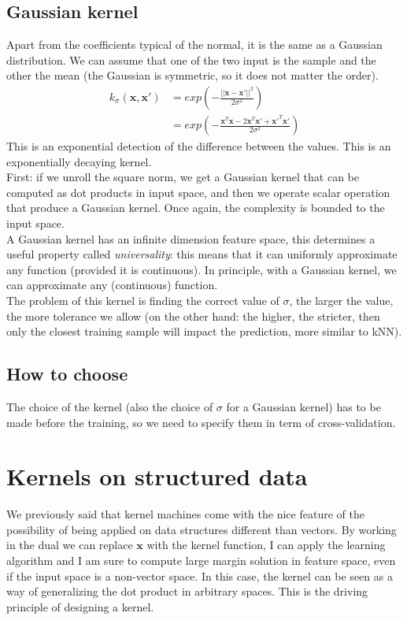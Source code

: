     \subsection{Gaussian kernel}
        \label{cha:gaussian_kernel}
        Apart from the coefficients typical of the normal, it is the same as a Gaussian distribution.  
        We can assume that one of the two input is the sample and the other the mean (the Gaussian is symmetric, so it does not matter the order).
        \begin{align*}
            k_{\sigma} (\pmb{x}, \pmb{x}') &= exp {\left(- \frac{||\pmb{x} - \pmb{x}'||^2}{2 \sigma^2} \right) } \\
                &= exp {\left( - \frac{\pmb{x}^T \pmb{x} - 2 \pmb{x}^T \pmb{x}' + \pmb{x}'^T\pmb{x}' }{2\sigma^2} \right)}
        \end{align*}
        This is an exponential detection of the difference between the values. This is an exponentially decaying kernel.\\
        
        First: if we unroll the square norm, we get a Gaussian kernel that can be computed as dot products in input space, and then we operate scalar operation that produce a Gaussian kernel.
        Once again, the complexity is bounded to the input space.\\
        A Gaussian kernel has an infinite dimension feature space, this determines a useful property called \textit{universality}: this means that it can uniformly approximate any function (provided it is continuous). 
        In principle, with a Gaussian kernel, we can approximate any (continuous) function.\\

        The problem of this kernel is finding the correct value of $\sigma$, the larger the value, the more tolerance we allow (on the other hand: the higher, the stricter, then only the closest training sample will impact the prediction, more similar to kNN). 

    \subsection{How to choose}
        The choice of the kernel (also the choice of $\sigma$ for a Gaussian kernel) has to be made before the training, so we need to specify them in term of cross-validation.

\section{Kernels on structured data}
    We previously said that kernel machines come with the nice feature of the possibility of being applied on data structures different than vectors. 
    By working in the dual we can replace $\pmb{x}$ with the kernel function, I can apply the learning algorithm and I am sure to compute large margin solution in feature space, even if the input space is a non-vector space.
    In this case, the kernel can be seen as a way of generalizing the dot product in arbitrary spaces. 
    This is the driving principle of designing a kernel.\\


